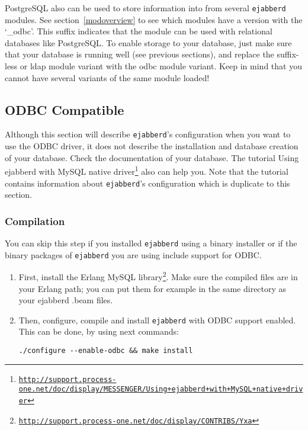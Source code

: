 \documentclass[a4paper,10pt]{book}
\newcommand{\ind}[1]{\begin{latexonly}\index{#1}\end{latexonly}}
\newcommand{\ejabberd}{\texttt{ejabberd}}
\gdef\footahref#1#2{#2\footnote{\href{#1}{\texttt{#1}}}}
\begin{document}
PostgreSQL also can be used to store information into from several \ejabberd{}
modules. See section~\ref{modoverview} to see which modules have a version
with the `\_odbc'. This suffix indicates that the module can be used with
relational databases like PostgreSQL. To enable storage to your database, just
make sure that your database is running well (see previous sections), and
replace the suffix-less or ldap module variant with the odbc module variant.
Keep in mind that you cannot have several variants of the same module loaded!

\subsection{ODBC Compatible}
\label{odbc}
\ind{databases!ODBC}

Although this section will describe \ejabberd{}'s configuration when you want to
use the ODBC driver, it does not describe the installation and database creation
of your database. Check the documentation of your database. The tutorial \footahref{http://support.process-one.net/doc/display/MESSENGER/Using+ejabberd+with+MySQL+native+driver}{Using ejabberd with MySQL native driver} also can help you. Note that the tutorial
contains information about \ejabberd{}'s configuration which is duplicate to
this section.

\subsubsection{Compilation}
\label{compileodbc}

You can skip this step if you installed \ejabberd{} using a binary installer or
if the binary packages of \ejabberd{} you are using include support for
ODBC.

\begin{enumerate}
\item First, install the \footahref{http://support.process-one.net/doc/display/CONTRIBS/Yxa}{Erlang
  MySQL library}. Make sure the compiled files are in your Erlang path; you can
  put them for example in the same directory as your ejabberd .beam files.
\item Then, configure, compile and install \ejabberd{} with ODBC support
  enabled. This can be done, by using next commands:
  \begin{verbatim}
./configure --enable-odbc && make install
\end{verbatim}
\end{enumerate}
\end{document}

